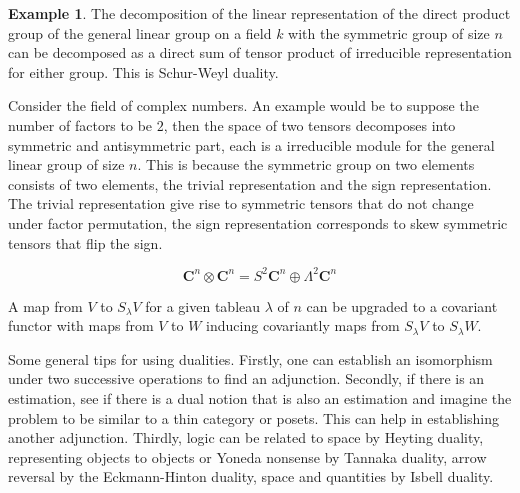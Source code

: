 \documentclass[10pt]{article}
\theoremstyle{plain}%
\theoremstyle{definition}
\newtheorem{example}{Example}[section]
\theoremstyle{remark}
\begin{document}
\begin{example}
	The decomposition of the linear representation of the direct product group of the general linear group on a field $k$ with the symmetric group of size $n$ can be decomposed as a direct sum of tensor product of irreducible representation for either group. This is Schur-Weyl duality.

	Consider the field of complex numbers.
	An example would be to suppose the number of factors to be $2$, then the space of two tensors decomposes into symmetric and antisymmetric part, each is a irreducible module for the general linear group of size $n$. This is because the symmetric group on two elements consists of two elements, the trivial representation and the sign representation. The trivial representation give rise to symmetric tensors that do not change under factor permutation, the sign representation corresponds to skew symmetric tensors that flip the sign.

	\begin{equation}
		\mathbf{C}^n \otimes \mathbf{C}^n
		= S^2 \mathbf{C}^n \oplus \Lambda^2 \mathbf{C}^n
	\end{equation}

	A map from $V$ to $S_\lambda V$ for a given tableau $\lambda$ of $n$ can be upgraded to a covariant functor with maps from $V$ to $W$ inducing covariantly maps from $S_\lambda V$ to $S_\lambda W$.
\end{example}

Some general tips for using dualities. Firstly, one can establish an isomorphism under two successive operations to find an adjunction. Secondly, if there is an estimation, see if there is a dual notion that is also an estimation and imagine the problem to be similar to a thin category or posets. This can help in establishing another adjunction. Thirdly, logic can be related to space by Heyting duality, representing objects to objects or Yoneda nonsense by Tannaka duality, arrow reversal by the Eckmann-Hinton duality, space and quantities by Isbell duality.
\end{document}

